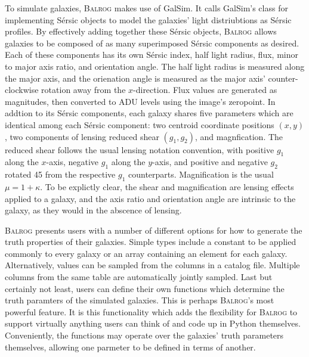\documentclass[12pt]{book}
\newcommand{\py}{Python}
\newcommand{\galsim}{GalSim}
\newcommand{\balrog}{\textsc{Balrog}}
\newcommand{\sersic}{S\'{e}rsic}
\begin{document}
To simulate galaxies, \balrog{} makes use of \galsim{}. 
It calls \galsim{}'s class for implementing \sersic{} objects to model the galaxies' light distriubtions as \sersic{} profiles. 
By effectively adding together these \sersic{} objects, \balrog{} allows galaxies to be composed of as many superimposed
\sersic{} components as desired. Each of these components has its own \sersic{} index, half light radius, flux,
minor to major axis ratio, and orientation angle. The half light radius is measured along
the major axis, and the orienation angle is measured as the major axis' counter-clockwise rotation
away from the $x$-direction. 
Flux values are generated as magnitudes, then converted to ADU levels 
using the image's zeropoint.
In addtion to its \sersic{} components, each galaxy
shares five parameters which are identical among each \sersic{} component:
two centroid coordinate positions $(x, y)$, two components of lensing reduced shear $(g_1, g_2)$, and magnfication.
The reduced shear follows the usual lensing notation convention, with positive $g_1$ along the $x$-axis,
negative $g_1$ along the $y$-axis, and positive and negative $g_2$ rotated 45\degree{} from the
respective $g_1$ counterparts. Magnification is the usual $\mu = 1 + \kappa$.
To be explictly clear, the shear and magnification are lensing effects applied to a galaxy,
and the axis ratio and orientation angle are intrinsic to the galaxy, as they would in the abscence of lensing.

\balrog{} presents users with a number of different options for how to generate
the truth properties of their galaxies.
Simple types include a constant to be applied commonly to every galaxy or an array containing an element for each galaxy.
Alternatively, values can be sampled from the columns in a catalog file. 
Multiple columns from the same table are automatically jointly sampled.
Last but certainly not least, users can define their own functions which determine the truth paramters of the simulated galaxies.
This is perhaps \balrog{}'s most powerful feature.
It is this functionality which adds the flexibility for \balrog{} to support
virtually anything users can think of and code up in \py{} themselves.
Conveniently, the functions may operate over the galaxies' truth parameters themselves,
allowing one parmeter to be defined in terms of another.
\end{document}
